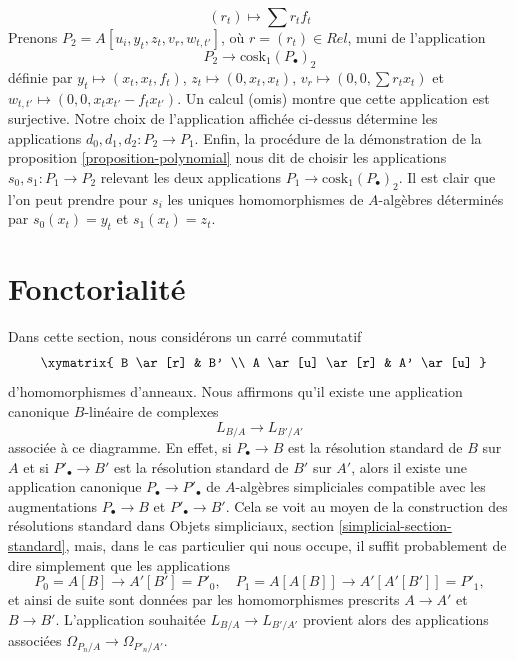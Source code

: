 \begin{example}
$$(r_t) \longmapsto \sum r_tf_t
$$
Prenons $P_2 = A[u_i, y_t, z_t, v_r, w_{t, t'}]$, où
$r = (r_t) \in Rel$, muni de l'application
$$
P_2 \longrightarrow \text{cosk}_1(P_\bullet)_2
$$
définie par $y_t  \mapsto (x_t, x_t, f_t)$,
$z_t \mapsto (0, x_t, x_t)$,
$v_r \mapsto (0, 0, \sum r_t x_t)$ et
$w_{t, t'} \mapsto (0, 0, x_t x_{t'} - f_t x_{t'})$. Un calcul (omis) montre
que cette application est surjective. Notre choix de l'application affichée
ci-dessus détermine les applications $d_0, d_1, d_2 : P_2 \to P_1$.
Enfin, la procédure de la démonstration de la proposition
\ref{proposition-polynomial} nous dit de choisir les applications
$s_0, s_1 : P_1 \to P_2$ relevant les deux applications
$P_1 \to \text{cosk}_1(P_\bullet)_2$. Il est clair que l'on peut prendre pour
$s_i$ les uniques homomorphismes de $A$-algèbres déterminés par
$s_0(x_t) = y_t$ et $s_1(x_t) = z_t$.
\end{example}








\section{Fonctorialité}
\label{section-functoriality}

\noindent
Dans cette section, nous considérons un carré commutatif
\begin{equation}
\label{equation-commutative-square}
\vcenter{
\xymatrix{
B \ar[r] & B' \\
A \ar[u] \ar[r] & A' \ar[u]
}
}
\end{equation}
d'homomorphismes d'anneaux. Nous affirmons qu'il existe une application
canonique $B$-linéaire de complexes
$$
L_{B/A} \longrightarrow L_{B'/A'}
$$
associée à ce diagramme. En effet, si $P_\bullet \to B$ est la résolution
standard de $B$ sur $A$ et si $P'_\bullet \to B'$ est la résolution standard
de $B'$ sur $A'$, alors il existe une application canonique
$P_\bullet \to P'_\bullet$
de $A$-algèbres simpliciales compatible avec les augmentations
$P_\bullet \to B$ et $P'_\bullet \to B'$. Cela se voit au moyen de la
construction des résolutions standard dans Objets simpliciaux, section
\ref{simplicial-section-standard}, mais, dans le cas particulier qui nous
occupe, il suffit probablement de dire simplement que les applications
$$
P_0 = A[B] \longrightarrow A'[B'] = P'_0,\quad
P_1 = A[A[B]] \longrightarrow A'[A'[B']] = P'_1,
$$
et ainsi de suite sont données par les homomorphismes prescrits $A \to A'$ et
$B \to B'$. L'application souhaitée $L_{B/A} \to L_{B'/A'}$ provient alors
des applications associées $\Omega_{P_n/A} \to \Omega_{P'_n/A'}$.

